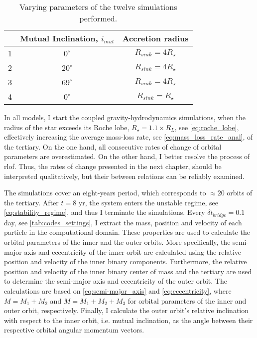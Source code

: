 
\begin{table}[H]
    \centering
    \begin{tabular}{| c | c | c |}
     \hline
     &Mutual Inclination, $i_{mut}$ & Accretion radius \\
    \hline
     1&$0^{\circ}$ & $R_{sink} = 4R_{\star}$\\
     2&$20^{\circ}$ & $R_{sink} = 4R_{\star}$ \\
     3&$69^{\circ}$ & $R_{sink} = 4R_{\star}$ \\
     \hline
     4&$0^{\circ}$ & $R_{sink} = R_{\star}$ \\
     \hline
    \end{tabular}
    \caption{ Varying parameters of the twelve simulations performed.}
\label{tab:simulations_settings}
\end{table}
In all models, I start the coupled gravity-hydrodynamics simulations, when the radius of the star exceeds its Roche lobe, $R_{\star} = 1.1 \times R_L$, see \cref{eq:roche_lobe}, effectively increasing the average mass-loss rate, see \cref{eq:mass_loss_rate_anal}, of the tertiary. On the one hand, all consecutive rates of change of orbital parameters are overestimated. On the other hand, I better resolve the process of \ac{rlof}. Thus, the rates of change presented in the next chapter, should be interpreted qualitatively, but their between relations can be reliably examined.

The simulations cover an eight-years period, which corresponds to $\approx 20$ orbits of the tertiary. After $t=8$ yr, the system enters the unstable regime, see \cref{eq:stability_regime}, and thus I terminate the simulations. Every $\delta t_{bridge}=0.1$ day, see \cref{tab:codes_settings}, I extract the mass, position and velocity of each particle in the computational domain. These properties are used to calculate the orbital parameters of the inner and the outer orbits. More specifically, the semi-major axis and eccentricity of the inner orbit are calculated using the relative position and velocity of the inner binary components. Furthermore, the relative position and velocity of the inner binary center of mass and the tertiary are used to determine the semi-major axis and eccentricity of the outer orbit. The calculations are based on \cref{eq:semi-major_axis} and \cref{eq:eccentricity}, where $M = M_1 + M_2$ and $M = M_1 + M_2 + M_3$ for orbital parameters of the inner and outer orbit, respectively. Finally, I calculate the outer orbit's relative inclination with respect to the inner orbit, i.e. mutual inclination, as the angle between their respective orbital angular momentum vectors.